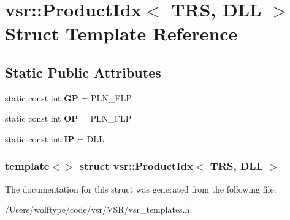 \hypertarget{structvsr_1_1_product_idx_3_01_t_r_s_00_01_d_l_l_01_4}{\section{vsr\-:\-:Product\-Idx$<$ T\-R\-S, D\-L\-L $>$ Struct Template Reference}
\label{structvsr_1_1_product_idx_3_01_t_r_s_00_01_d_l_l_01_4}
}
\subsection*{Static Public Attributes}
\begin{DoxyCompactItemize}
\item 
\hypertarget{structvsr_1_1_product_idx_3_01_t_r_s_00_01_d_l_l_01_4_a4600c27c589bab6f80ba62da9a2f6c94}{static const int {\bfseries G\-P} = P\-L\-N\-\_\-\-F\-L\-P}\label{structvsr_1_1_product_idx_3_01_t_r_s_00_01_d_l_l_01_4_a4600c27c589bab6f80ba62da9a2f6c94}

\item 
\hypertarget{structvsr_1_1_product_idx_3_01_t_r_s_00_01_d_l_l_01_4_af2be97f4082aa3297b80b2cfc5cd8658}{static const int {\bfseries O\-P} = P\-L\-N\-\_\-\-F\-L\-P}\label{structvsr_1_1_product_idx_3_01_t_r_s_00_01_d_l_l_01_4_af2be97f4082aa3297b80b2cfc5cd8658}

\item 
\hypertarget{structvsr_1_1_product_idx_3_01_t_r_s_00_01_d_l_l_01_4_abbf46e7d2f4661e9348c49bb81215655}{static const int {\bfseries I\-P} = D\-L\-L}\label{structvsr_1_1_product_idx_3_01_t_r_s_00_01_d_l_l_01_4_abbf46e7d2f4661e9348c49bb81215655}

\end{DoxyCompactItemize}
\subsubsection*{template$<$$>$ struct vsr\-::\-Product\-Idx$<$ T\-R\-S, D\-L\-L $>$}



The documentation for this struct was generated from the following file\-:\begin{DoxyCompactItemize}
\item 
/\-Users/wolftype/code/vsr/\-V\-S\-R/vsr\-\_\-templates.\-h\end{DoxyCompactItemize}
